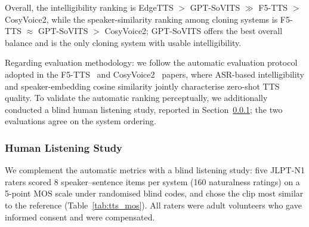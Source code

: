 \documentclass[journal]{IEEEtran}
\begin{document}
Overall, the intelligibility ranking is EdgeTTS $>$ GPT-SoVITS $\gg$ F5-TTS $>$ CosyVoice2, while the speaker-similarity ranking among cloning systems is F5-TTS $\approx$ GPT-SoVITS $>$ CosyVoice2; GPT-SoVITS offers the best overall balance and is the only cloning system with usable intelligibility.

Regarding evaluation methodology: we follow the automatic evaluation protocol adopted in the F5-TTS~\cite{chen2024f5tts} and CosyVoice2~\cite{cosyvoice2_2024} papers, where ASR-based intelligibility and speaker-embedding cosine similarity jointly characterise zero-shot TTS quality.
To validate the automatic ranking perceptually, we additionally conducted a blind human listening study, reported in Section~\ref{sec:tts_human}; the two evaluations agree on the system ordering.



\subsubsection{Human Listening Study}
\label{sec:tts_human}

We complement the automatic metrics with a blind listening study: five JLPT-N1 raters scored 8 speaker--sentence items per system (160 naturalness ratings) on a 5-point MOS scale under randomised blind codes, and chose the clip most similar to the reference (Table~\ref{tab:tts_mos}). All raters were adult volunteers who gave informed consent and were compensated.

\begin{table}[t]
\centering
\caption{Human listening study results ($n$\,=\,5 JLPT-N1 raters, 8 items per system, blind randomised presentation). MOS = naturalness mean opinion score (1--5); Sim.\ votes = share of ``most similar to reference'' selections (40 votes total; 35\% of votes were ``none''). EdgeTTS uses a fixed voice and received no similarity votes. Best per column in bold.}
\label{tab:tts_mos}
\end{table}
\end{document}
